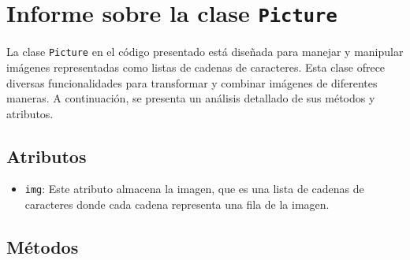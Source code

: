 \section{Informe sobre la clase \texttt{Picture}}

La clase \texttt{Picture} en el código presentado está diseñada para manejar y manipular imágenes representadas como listas de cadenas de caracteres. Esta clase ofrece diversas funcionalidades para transformar y combinar imágenes de diferentes maneras. A continuación, se presenta un análisis detallado de sus métodos y atributos.

\subsection{Atributos}

\begin{itemize}
    \item \texttt{img}: Este atributo almacena la imagen, que es una lista de cadenas de caracteres donde cada cadena representa una fila de la imagen.
\end{itemize}

\subsection{Métodos}

